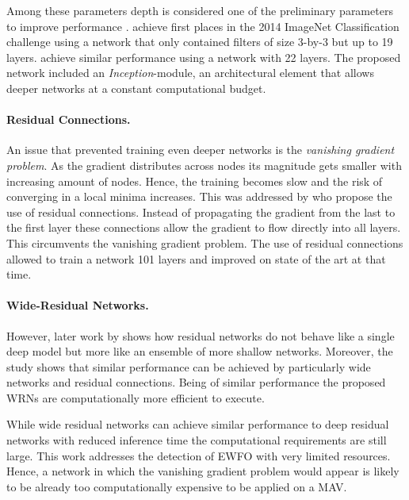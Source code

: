 Among these parameters depth is considered one of the preliminary parameters to improve performance \cite{He}. \citeauthor{Simonyan2014} \cite{Simonyan2014} achieve first places in the 2014 ImageNet Classification challenge using a network that only contained filters of size 3-by-3 but up to 19 layers. \citeauthor{Szegedy2014} \cite{Szegedy2014} achieve similar performance using a network with 22 layers. The proposed network included an \textit{Inception}-module, an architectural element that allows deeper networks at a constant computational budget. 

\paragraph{Residual Connections.}

An issue that prevented training even deeper networks is the \textit{vanishing gradient problem}. As the gradient distributes across nodes its magnitude gets smaller with increasing amount of nodes. Hence, the training becomes slow and the risk of converging in a local minima increases. This was addressed by \citeauthor{He2015} \cite{He2015} who propose the use of residual connections. Instead of propagating the gradient from the last to the first layer these connections allow the gradient to flow directly into all layers. This circumvents the vanishing gradient problem. The use of residual connections allowed to train a network 101 layers and improved on state of the art at that time.

\paragraph{Wide-Residual Networks.}

However, later work by \citeauthor{Zagoruyko2016} \cite{Zagoruyko2016} shows how residual networks do not behave like a single deep model but more like an ensemble of more shallow networks. Moreover, the study shows that similar performance can be achieved by particularly wide networks and residual connections. Being of similar performance the proposed \acp{WRN} are computationally more efficient to execute.

While wide residual networks can achieve similar performance to deep residual networks with reduced inference time the computational requirements are still large. This work addresses the detection of \ac{EWFO} with very limited resources. Hence, a network in which the vanishing gradient problem would appear is likely to be already too computationally expensive to be applied on a \ac{MAV}.

